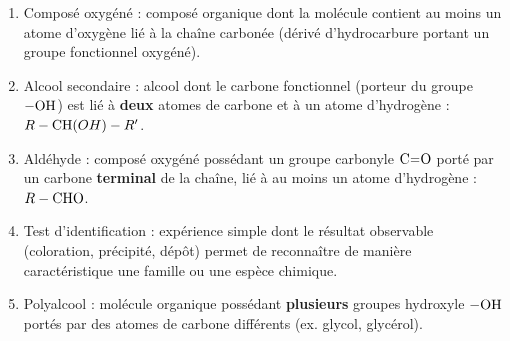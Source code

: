 \documentclass[11pt]{article}
\newcommand{\cle}[1]{{\popxbold\color{popdark}#1}}
\begin{document}
\begin{corrige}
\begin{enumerate}
\item \cle{Composé oxygéné} : composé organique dont la molécule contient au moins un atome d'oxygène lié à la chaîne carbonée (dérivé d'hydrocarbure portant un groupe fonctionnel oxygéné).
\item \cle{Alcool secondaire} : alcool dont le carbone fonctionnel (porteur du groupe $-\ce{OH}$) est lié à \textbf{deux} atomes de carbone et à un atome d'hydrogène : $R-\ce{CH}(OH)-R'$.
\item \cle{Aldéhyde} : composé oxygéné possédant un groupe carbonyle $\ce{C=O}$ porté par un carbone \textbf{terminal} de la chaîne, lié à au moins un atome d'hydrogène : $R-\ce{CHO}$.
\item \cle{Test d'identification} : expérience simple dont le résultat observable (coloration, précipité, dépôt) permet de reconnaître de manière caractéristique une famille ou une espèce chimique.
\item \cle{Polyalcool} : molécule organique possédant \textbf{plusieurs} groupes hydroxyle $-\ce{OH}$ portés par des atomes de carbone différents (ex. glycol, glycérol).
\end{enumerate}
\end{corrige}
\end{document}
